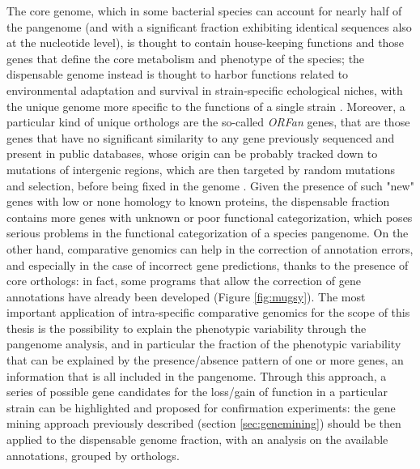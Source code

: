 The core genome, which in some bacterial species can account for nearly half of the pangenome (and with a significant fraction exhibiting identical sequences also at the nucleotide level), is thought to contain house-keeping functions and those genes that define the core metabolism and phenotype of the species; the dispensable genome instead is thought to harbor functions related to environmental adaptation and survival in strain-specific echological niches, with the unique genome more specific to the functions of a single strain \cite{medini2005microbial}. Moreover, a particular kind of unique orthologs are the so-called \textit{ORFan} genes, that are those genes that have no significant similarity to any gene previously sequenced and present in public databases, whose origin can be probably tracked down to mutations of intergenic regions, which are then targeted by random mutations and selection, before being fixed in the genome \cite{yomtovian2010composition}. Given the presence of such "new" genes with low or none homology to known proteins, the dispensable fraction contains more genes with unknown or poor functional categorization, which poses serious problems in the functional categorization of a species pangenome. On the other hand, comparative genomics can help in the correction of annotation errors, and especially in the case of incorrect gene predictions, thanks to the presence of core orthologs: in fact, some programs that allow the correction of gene annotations have already been developed \cite{samuel12improving} (Figure \ref{fig:mugsy}).
The most important application of intra-specific comparative genomics for the scope of this thesis is the possibility to explain the phenotypic variability through the pangenome analysis, and in particular the fraction of the phenotypic variability that can be explained by the presence/absence pattern of one or more genes, an information that is all included in the pangenome. Through this approach, a series of possible gene candidates for the loss/gain of function in a particular strain can be highlighted and proposed for confirmation experiments: the gene mining approach previously described (section \ref{sec:genemining}) should be then applied to the dispensable genome fraction, with an analysis on the available annotations, grouped by orthologs.

